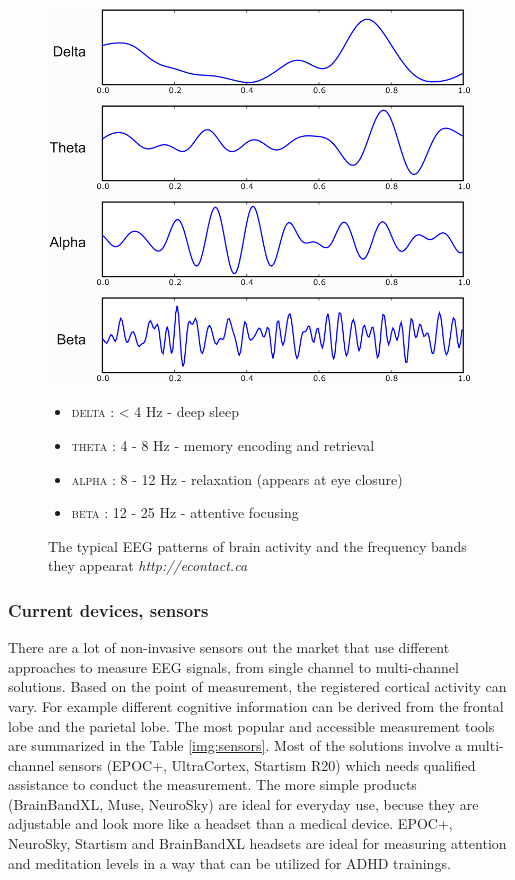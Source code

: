 \documentclass[letterpaper,10pt]{article}
\begin{document}
\begin{figure}[h]
\centering
\begin{minipage}{.5\textwidth}
  \centering
  \includegraphics[width=0.8 \linewidth]{freq_bands.png}
\end{minipage}%
\begin{minipage}{.5\textwidth}
\begin{itemize}
    \item \textsc{delta} : < 4 Hz - deep sleep 
    \item \textsc{theta} : 4 - 8 Hz - memory encoding and retrieval
    \item \textsc{alpha} : 8 - 12 Hz - relaxation (appears at eye closure)
    \item \textsc{beta} : 12 - 25 Hz - attentive focusing
\end{itemize}
\end{minipage}
\caption[The typical EEG patterns of brain activity]{The typical EEG patterns of brain activity and the frequency bands they appearat \textit{http://econtact.ca}}
\label{fig:class}
\end{figure}


\subsubsection{Current devices, sensors}

There are a lot of non-invasive sensors out the market that use different approaches to measure EEG signals, from single channel to multi-channel solutions. Based on the point of measurement, the registered cortical activity can vary. For example different cognitive information can be derived from the frontal lobe and the parietal lobe.
The most popular and accessible measurement tools are summarized in the Table \ref{img:sensors}. Most of the solutions involve a multi-channel sensors (EPOC+, UltraCortex, Startism R20) which needs qualified assistance to conduct the measurement. The more simple products (BrainBandXL, Muse, NeuroSky) are ideal for everyday use, becuse they are adjustable and look more like a headset than a medical device. EPOC+, NeuroSky, Startism  and BrainBandXL headsets are ideal for measuring attention and meditation levels in a way that can be utilized for ADHD trainings.
\end{document}
